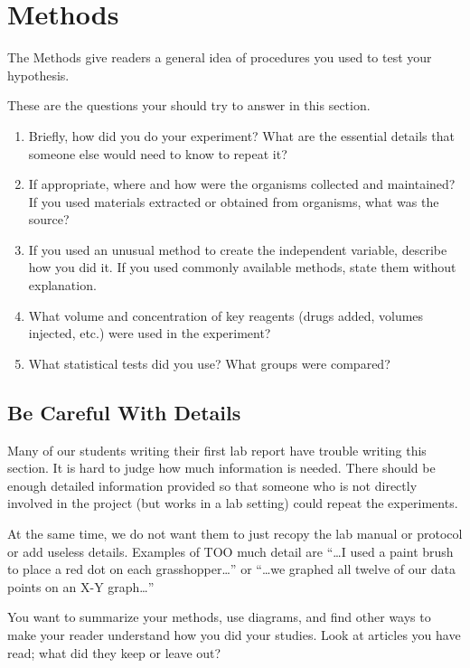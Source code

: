 \documentclass[
]{book}
\providecommand{\tightlist}{%
  \setlength{\itemsep}{0pt}\setlength{\parskip}{0pt}}
\begin{document}
\hypertarget{methods350}{%
\chapter{Methods}\label{methods350}}

The Methods give readers a general idea of procedures you used to test your hypothesis.

These are the questions your should try to answer in this section.

\begin{enumerate}
\def\labelenumi{\arabic{enumi}.}
\tightlist
\item
  Briefly, how did you do your experiment? What are the essential details that someone else would need to know to repeat it?
\item
  If appropriate, where and how were the organisms collected and maintained? If you used materials extracted or obtained from organisms, what was the source?
\item
  If you used an unusual method to create the independent variable, describe how you did it. If you used commonly available methods, state them without explanation.
\item
  What volume and concentration of key reagents (drugs added, volumes injected, etc.) were used in the experiment?
\item
  What statistical tests did you use? What groups were compared?
\end{enumerate}

\hypertarget{be-careful-with-details}{%
\section{Be Careful With Details}\label{be-careful-with-details}}

Many of our students writing their first lab report have trouble writing this section. It is hard to judge how much information is needed. There should be enough detailed information provided so that someone who is not directly involved in the project (but works in a lab setting) could repeat the experiments.

At the same time, we do not want them to just recopy the lab manual or protocol or add useless details. Examples of TOO much detail are ``\ldots I used a paint brush to place a red dot on each grasshopper\ldots{}'' or ``\ldots we graphed all twelve of our data points on an X-Y graph\ldots{}''

You want to summarize your methods, use diagrams, and find other ways to make your reader understand how you did your studies. Look at articles you have read; what did they keep or leave out?
\end{document}
